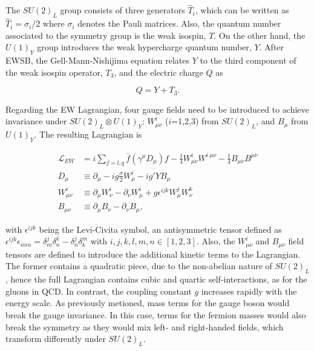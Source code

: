 The $SU(2)_L$ group consists of three generators $\hat{T}_i$, which can be written as $\hat{T}_i=\sigma_i/2$ where $\sigma_i$ denotes the Pauli matrices. Also, the quantum number associated to the symmetry group is the weak isospin, $T$.
On the other hand, the $U(1)_Y$ group introduces the weak hypercharge quantum number, $Y$. After \acrshort{EWSB},
the Gell-Mann-Nishijima equation relates $Y$ to the third component of the weak isospin operator, $T_3$, and the electric charge $Q$ as

\begin{equation}
Q = Y+T_3.
\end{equation}

Regarding the \acrshort{EW} Lagrangian, four gauge fields need to be introduced to achieve invariance under $SU(2)_L\otimes U(1)_Y$: $W_{\mu\nu}^i$ ($i$=1,2,3) from $SU(2)_L$, and $B_\mu$ from $U(1)_Y$. The resulting Lagrangian is

\begin{equation}
\label{Theory_eq:EWlagrangian}
\begin{split}
    \mathcal{L}_{EW}&=i\sum_{f=l,q}\bar{f}(\gamma^\mu D_\mu)f - \frac{1}{4}W_{\mu\nu}^iW^{i\ \mu\nu} - \frac{1}{4}B_{\mu\nu}B^{\mu\nu}\\
    D_{\mu \ } &\equiv \partial_\mu - ig\frac{\sigma}{2}W_\mu^i-ig'YB_\mu \\
    W_{\mu\nu}^i &\equiv \partial_\mu W_\nu^i - \partial_\nu W_\mu^i +g\epsilon^{ijk}W_\mu^j W_\nu^k\\
    B_{\mu\nu}&\equiv\partial_\mu B_\nu - \partial_\nu B_\mu,
    \end{split}
\end{equation}

with $\epsilon^{ijk}$ being the Levi-Civita symbol, an antisymmetric tensor defined as $\epsilon^{ijk}\epsilon_{imn}=\delta^j_m\delta^k_n-\delta^j_n\delta^m_k$ with $i,j,k,l,m,n\in[1,2,3]$. Also, the $W_{\mu\nu}^i$ and $B_{\mu\nu}$ field tensors are defined to introduce the additional kinetic terms to the Lagrangian. The former contains a quadratic piece, due to the non-abelian nature of $SU(2)_L$, hence the full Lagrangian contains cubic and quartic self-interactions, as for the gluons in QCD. In contrast, the coupling constant $g$ increases rapidly with the energy scale. As previously metioned, mass terms for the gauge boson would break the gauge invariance. In this case, terms for the fermion masses would also break the symmetry as they would mix left- and right-handed fields, which transform differently under $SU(2)_L$.\\

